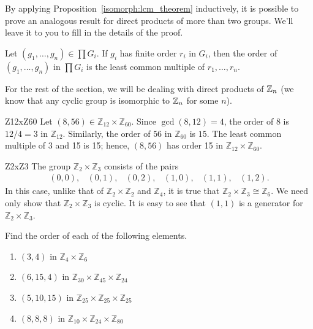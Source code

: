 By applying Proposition~\ref{isomorph:lcm_theorem} inductively, it is possible to prove an analogous result for direct products of more than two groups. We'll leave it to you to fill in the details of the proof.

\begin{corollary}
Let $(g_1, \ldots, g_n) \in \prod G_i$. If $g_i$ has finite order
$r_i$ in $G_i$, then the order of $(g_1, \ldots, g_n)$ in $\prod G_i$
is the least common multiple of $r_1, \ldots, r_n$.
\end{corollary}
 
 For the rest of the section, we will be dealing with direct products of $\mathbb{Z}_n$ (we know that any cyclic group is isomorphic to $\mathbb{Z}_n$ for some $n$). 

\begin{example}{Z12xZ60}
Let $(8, 56) \in {\mathbb Z}_{12} \times  {\mathbb Z}_{60}$. Since
$\gcd(8,12) = 4$, the order of 8 is $12/4 = 3$ in ${\mathbb Z}_{12}$.
Similarly, the order of $56$ in ${\mathbb Z}_{60}$ is $15$. The least
common multiple of 3 and 15 is 15; hence, $(8, 56)$ has order 15 in
${\mathbb Z}_{12} \times  {\mathbb Z}_{60}$.
\end{example}

 
\begin{example}{Z2xZ3}
The group ${\mathbb Z}_2 \times {\mathbb Z}_3$ consists of the pairs
\[
\begin{array}{cccccc}
(0,0),& (0, 1),& (0, 2),& (1,0),& (1, 1),& (1, 2).
\end{array}
\]
In this case, unlike that of ${\mathbb Z}_2 \times {\mathbb Z}_2$ and
${\mathbb Z}_4$, it 
is true that ${\mathbb Z}_2  \times {\mathbb Z}_3 \cong {\mathbb Z}_6$. We need
only show that ${\mathbb Z}_2  \times {\mathbb Z}_3$ is cyclic.  It is
easy to see that $(1,1)$ is a generator for ${\mathbb Z}_2  \times {\mathbb
Z}_3$. 
\end{example}

\begin{exercise}{}
Find the order of each of the following elements.
\begin{enumerate}
  \item
$(3, 4)$ in ${\mathbb Z}_4 \times {\mathbb Z}_6$
 \item
$(6, 15, 4)$ in ${\mathbb Z}_{30} \times {\mathbb Z}_{45} \times {\mathbb
Z}_{24}$
 \item
$(5, 10, 15)$ in ${\mathbb Z}_{25} \times {\mathbb Z}_{25} \times {\mathbb
Z}_{25}$
 \item
$(8, 8, 8)$ in ${\mathbb Z}_{10} \times {\mathbb Z}_{24} \times {\mathbb
Z}_{80}$
 \end{enumerate}
 \end{exercise}


